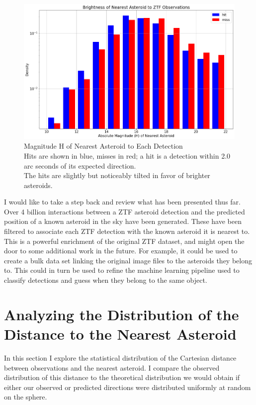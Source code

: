\begin{figure}[hbt!]
\begin{center}
\includegraphics[width=1.0\textwidth]{../figs/ztf/nearest_ast_brightness.png}
\caption{Magnitude H of Nearest Asteroid to Each Detection\\
Hits are shown in blue, misses in red; a hit is a detection within 2.0 arc seconds of its expected direction.\\
The hits are slightly but noticeably tilted in favor of brighter asteroids.}
\end{center}
\end{figure}

I would like to take a step back and review what has been presented thus far.
Over 4 billion interactions between a ZTF asteroid detection and the predicted position of a known asteroid in the sky have been generated.
These have been filtered to associate each ZTF detection with the known asteroid it is nearest to.
This is a powerful enrichment of the original ZTF dataset, and might open the door to some additional work in the future.
For example, it could be used to create a bulk data set linking the original image files to the asteroids they belong to.
This could in turn be used to refine the machine learning pipeline used to classify detections and guess when they belong to the same object.

\section{Analyzing the Distribution of the Distance to the Nearest Asteroid}
\label{section_nearest_ast_distribution}
In this section I explore the statistical distribution of the Cartesian distance between observations and the nearest asteroid.
I compare the observed distribution of this distance to the theoretical distribution we would obtain 
if either our observed or predicted directions were distributed uniformly at random on the sphere.

